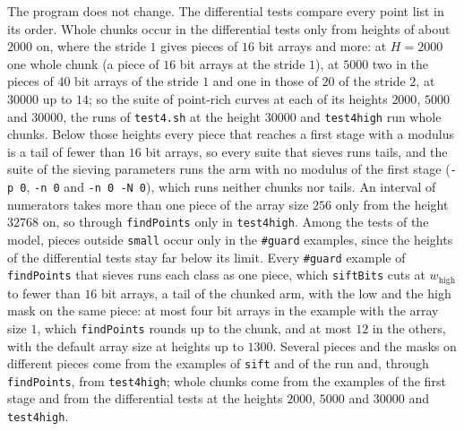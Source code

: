 The program does not change. The differential tests compare every point list in its order. Whole
chunks occur in the differential tests only from heights of about $2000$ on, where the stride $1$
gives pieces of $16$ bit arrays and more: at $H = 2000$ one whole chunk (a piece of $16$ bit arrays
at the stride $1$), at $5000$ two in the pieces of $40$ bit arrays of the stride $1$ and one in
those of $20$ of the stride $2$, at $30000$ up to $14$; so the suite of point-rich curves at each of
its heights $2000$, $5000$ and $30000$, the runs of \verb|test4.sh| at the height $30000$ and
\verb|test4high| run whole chunks. Below those heights every piece that reaches a first stage with a
modulus is a tail of fewer than $16$ bit arrays, so every suite that sieves runs tails, and the
suite of the sieving parameters runs the arm with no modulus of the first stage (\verb|-p 0|,
\verb|-n 0| and \verb|-n 0 -N 0|), which runs neither chunks nor tails. An interval of numerators
takes more than one piece of the array size $256$ only from the height $32768$ on, so through
\verb|findPoints| only in \verb|test4high|. Among the tests of the model, pieces outside
\verb|small| occur only in the \verb|#guard| examples, since the heights of the differential tests
stay far below its limit. Every \verb|#guard| example of \verb|findPoints| that sieves runs each
class as one piece, which \verb|siftBits| cuts at $w_{\mathrm{high}}$ to fewer than $16$ bit arrays,
a tail of the chunked arm, with the low and the high mask on the same piece: at most four bit arrays
in the example with the array size $1$, which \verb|findPoints| rounds up to the chunk, and at most
$12$ in the others, with the default array size at heights up to $1300$. Several pieces and the
masks on different pieces come from the examples of \verb|sift| and of the run and, through
\verb|findPoints|, from \verb|test4high|; whole chunks come from the examples of the first stage and
from the differential tests at the heights $2000$, $5000$ and $30000$ and \verb|test4high|.

